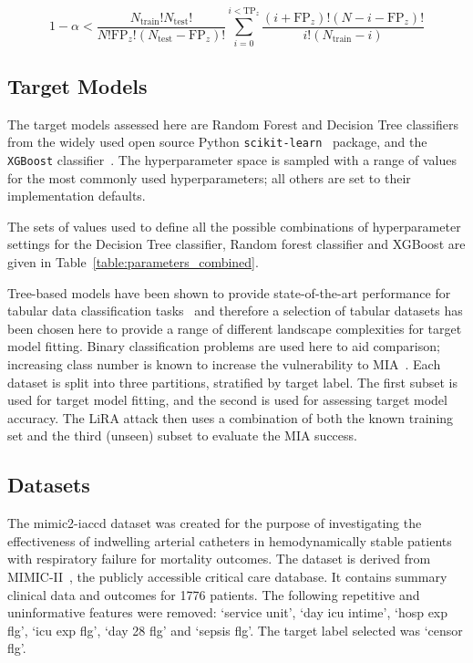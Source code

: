 \begin{equation}
    1 - \alpha < \frac{N_{\text{train}}!N_{\text{test}}!}{N!\text{FP}_z!(N_{\text{test}}-\text{FP}_z)!}\sum_{i=0}^{i<\text{TP}_z} \frac{(i+\text{FP}_z)! (N-i-\text{FP}_z)!}{i!(N_{\text{train}}-i)}\label{vulnerableprob}
\end{equation}\label{eq:vulerability}

\subsection{Target Models}

The target models assessed here are Random Forest and Decision Tree classifiers from the widely used open source Python \texttt{scikit-learn}~\cite{Pedregosa:2011} package, and the \texttt{XGBoost} classifier~\cite{Chen:2016}. The hyperparameter space is sampled with a range of values for the most commonly used hyperparameters; all others are set to their implementation defaults.

The sets of values used to define all the possible combinations of hyperparameter settings for the Decision Tree classifier, Random forest classifier and XGBoost are given in Table~\ref{table:parameters_combined}.


 
Tree-based models have been shown to provide state-of-the-art performance for tabular data classification tasks~\cite{Schwartz-Ziv:2022, Chen:2016} and therefore a selection of tabular datasets has been chosen here to provide a range of different landscape complexities for target model fitting. Binary classification problems are used here to aid comparison; increasing class number is known to increase the vulnerability to MIA~\cite{Shokri:2017}. Each dataset is split into three partitions, stratified by target label. The first subset is used for target model fitting, and the second is used for assessing target model accuracy. The LiRA attack then uses a combination of both the known training set and the third (unseen) subset to evaluate the MIA success.

\subsection{Datasets}

The mimic2-iaccd dataset was created for the purpose of investigating the effectiveness of indwelling arterial catheters in hemodynamically stable patients with respiratory failure for mortality outcomes. The dataset is derived from MIMIC-II~\cite{Raffa:2016}, the publicly accessible critical care database. It contains summary clinical data and outcomes for 1776 patients. The following repetitive and uninformative features were removed: `service unit', `day icu intime', `hosp exp flg', `icu exp flg', `day 28 flg' and `sepsis flg'. The target label selected was `censor flg'.

